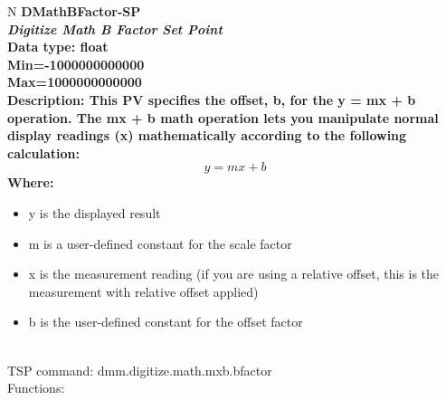 \documentclass[openany]{article}
\begin{document}
		\begin{tabular}{N}
			\hline
			\bfseries DMathBFactor-SP\label{pv:dmathbfactor-sp} \\ \hline
			\emph{Digitize Math B Factor Set Point} \\
			Data type: float \\
			Min=-1000000000000 \\
			Max=1000000000000 \\
			Description: This PV specifies the offset, b, for the y = mx + b operation. The mx + b math operation lets you manipulate normal display readings (x) mathematically according to the following calculation: $$ y = mx + b $$ Where: \begin{itemize} \item y is the displayed result \item m is a user-defined constant for the scale factor \item x is the measurement reading (if you are using a relative offset, this is the measurement with relative offset applied) \item b is the user-defined constant for the offset factor \end{itemize} \\
			TSP command: dmm.digitize.math.mxb.bfactor \\
			Functions: \\
			\arrayrulecolor{\FuncTableBorderColor}

		\end{tabular}
\end{document}
